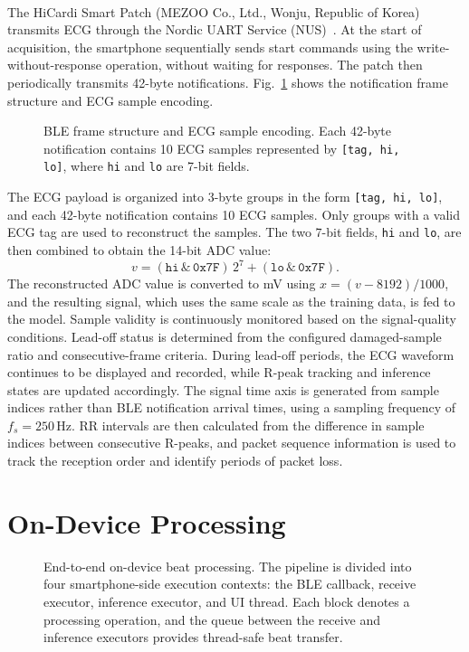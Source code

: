 The HiCardi\textsuperscript{\textregistered} Smart Patch (MEZOO Co., Ltd., Wonju, Republic of Korea) transmits ECG through the Nordic UART Service (NUS)~\cite{nus}.
At the start of acquisition, the smartphone sequentially sends start commands using the write-without-response operation, without waiting for responses.
The patch then periodically transmits 42-byte notifications.
Fig.~\ref{fig:ble_spec} shows the notification frame structure and ECG sample encoding.
\begin{figure}[t]
\centering

\caption[BLE frame structure and ECG sample encoding.]{
BLE frame structure and ECG sample encoding.
Each 42-byte notification contains 10 ECG samples represented by
\texttt{[tag, hi, lo]}, where \texttt{hi} and \texttt{lo} are 7-bit fields.
}
\label{fig:ble_spec}
\end{figure}
The ECG payload is organized into 3-byte groups in the form \texttt{[tag, hi, lo]},
and each 42-byte notification contains 10 ECG samples.
Only groups with a valid ECG tag are used to reconstruct the samples.
The two 7-bit fields, \texttt{hi} and \texttt{lo}, are then combined to obtain the 14-bit ADC value:
\begin{equation}
v=(\texttt{hi}\,\&\,\texttt{0x7F})\,2^7+(\texttt{lo}\,\&\,\texttt{0x7F}).
\label{eq:ble_decode}
\end{equation}
The reconstructed ADC value is converted to mV using $x=(v-8192)/1000$,
and the resulting signal, which uses the same scale as the training data, is fed to the model.
Sample validity is continuously monitored based on the signal-quality conditions.
Lead-off status is determined from the configured damaged-sample ratio and consecutive-frame criteria.
During lead-off periods, the ECG waveform continues to be displayed and recorded,
while R-peak tracking and inference states are updated accordingly.
The signal time axis is generated from sample indices rather than BLE notification arrival times,
using a sampling frequency of $f_s=250\,\mathrm{Hz}$.
RR intervals are then calculated from the difference in sample indices between consecutive R-peaks,
and packet sequence information is used to track the reception order and identify periods of packet loss.
 
\section{On-Device Processing}
\label{sec:impl_pipeline}
\begin{figure}[t]
\centering

\caption[End-to-end on-device beat processing.]{
End-to-end on-device beat processing.
The pipeline is divided into four smartphone-side execution contexts:
the BLE callback, receive executor, inference executor, and UI thread.
Each block denotes a processing operation, and the queue between the receive
and inference executors provides thread-safe beat transfer.
}
\label{fig:impl_beat}
\end{figure}
 
